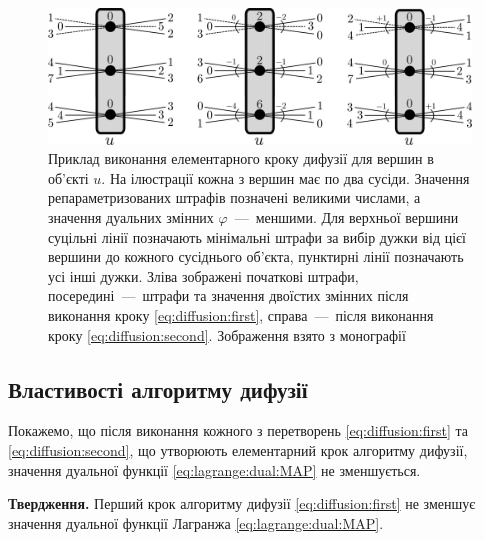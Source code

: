 \begin{figure}[h]
  \centering
  \includegraphics[width=\textwidth]{images/diffusion_step}
  \caption{Приклад виконання елементарного кроку дифузії для вершин в об'єкті $u$.
           На ілюстрації кожна з вершин має по два сусіди.
           Значення репараметризованих штрафів позначені великими числами,
           а значення дуальних змінних $\varphi$~---~меншими.
           Для верхньої вершини суцільні лінії позначають мінімальні штрафи
           за вибір дужки від цієї вершини до кожного сусіднього об'єкта,
           пунктирні лінії позначають усі інші дужки.
           Зліва зображені початкові штрафи,
           посередині~---~штрафи та значення
           двоїстих змінних після виконання кроку \eqref{eq:diffusion:first},
           справа~---~після виконання кроку \eqref{eq:diffusion:second}.
           Зображення взято з монографії \cite{overview:savchynskyy:diffusion}}
  \label{fig:diffusion:step}
\end{figure}

\subsection{Властивості алгоритму дифузії}

Покажемо, що після виконання кожного з перетворень \eqref{eq:diffusion:first}
та \eqref{eq:diffusion:second},
що утворюють елементарний крок алгоритму дифузії,
значення дуальної функції \eqref{eq:lagrange:dual:MAP} не зменшується.

\textbf{Твердження.}
Перший крок алгоритму дифузії \eqref{eq:diffusion:first}
не зменшує значення дуальної функції Лагранжа \eqref{eq:lagrange:dual:MAP}.

